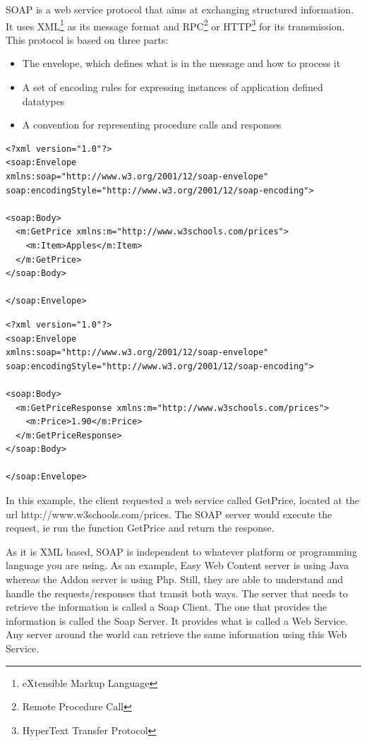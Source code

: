SOAP is a web service protocol that aims at exchanging structured information. It uses XML\footnote{eXtensible Markup Language} as its message format and RPC\footnote{Remote Procedure Call} or HTTP\footnote{HyperText Transfer Protocol} for its transmission. This protocol is based on three parts:
\begin{itemize}
\item The envelope, which defines what is in the message and how to process it
\item A set of encoding rules for expressing instances of application defined datatypes
\item A convention for representing procedure calls and responses
\end{itemize}
\lstset{language=XML}
\begin{lstlisting}[label=soap request,caption=Example of a SOAP request]
<?xml version="1.0"?>
<soap:Envelope
xmlns:soap="http://www.w3.org/2001/12/soap-envelope"
soap:encodingStyle="http://www.w3.org/2001/12/soap-encoding">

<soap:Body>
  <m:GetPrice xmlns:m="http://www.w3schools.com/prices">
    <m:Item>Apples</m:Item>
  </m:GetPrice>
</soap:Body>

</soap:Envelope>
\end{lstlisting}
\lstset{language=XML}
\begin{lstlisting}[label=soap response,caption=Example of a SOAP response]
<?xml version="1.0"?>
<soap:Envelope
xmlns:soap="http://www.w3.org/2001/12/soap-envelope"
soap:encodingStyle="http://www.w3.org/2001/12/soap-encoding">

<soap:Body>
  <m:GetPriceResponse xmlns:m="http://www.w3schools.com/prices">
    <m:Price>1.90</m:Price>
  </m:GetPriceResponse>
</soap:Body>

</soap:Envelope>
\end{lstlisting}
In this example, the client requested a web service called GetPrice, located at the url http://www.w3schools.com/prices. The SOAP server would execute the request, ie run the function GetPrice and return the response.

As it is XML based, SOAP is independent to whatever platform or programming language you are using. As an example, Easy Web Content server is using Java whereas the Addon server is using Php. Still, they are able to understand and handle the requests/responses that transit both ways.
The server that needs to retrieve the information is called a Soap Client. The one that provides the information is called the Soap Server. It provides what is called a Web Service. Any server around the world can retrieve the same information using this Web Service.

